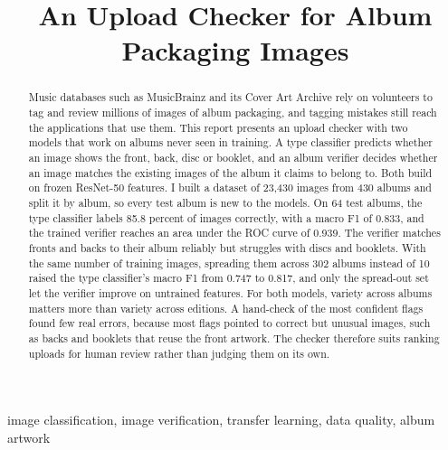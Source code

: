 \documentclass[conference]{IEEEtran}
\begin{document}
\title{An Upload Checker for Album Packaging Images
}

\author{
}

\maketitle

\begin{abstract}
Music databases such as MusicBrainz and its Cover Art Archive rely on volunteers to tag and review millions of images of album packaging, and tagging mistakes still reach the applications that use them. This report presents an upload checker with two models that work on albums never seen in training. A type classifier predicts whether an image shows the front, back, disc or booklet, and an album verifier decides whether an image matches the existing images of the album it claims to belong to. Both build on frozen ResNet-50 features. I built a dataset of 23,430 images from 430 albums and split it by album, so every test album is new to the models. On 64 test albums, the type classifier labels 85.8 percent of images correctly, with a macro F1 of 0.833, and the trained verifier reaches an area under the ROC curve of 0.939. The verifier matches fronts and backs to their album reliably but struggles with discs and booklets. With the same number of training images, spreading them across 302 albums instead of 10 raised the type classifier's macro F1 from 0.747 to 0.817, and only the spread-out set let the verifier improve on untrained features. For both models, variety across albums matters more than variety across editions. A hand-check of the most confident flags found few real errors, because most flags pointed to correct but unusual images, such as backs and booklets that reuse the front artwork. The checker therefore suits ranking uploads for human review rather than judging them on its own.
\end{abstract}

\begin{IEEEkeywords}
image classification, image verification, transfer learning, data quality, album artwork
\end{IEEEkeywords}

\end{document}
